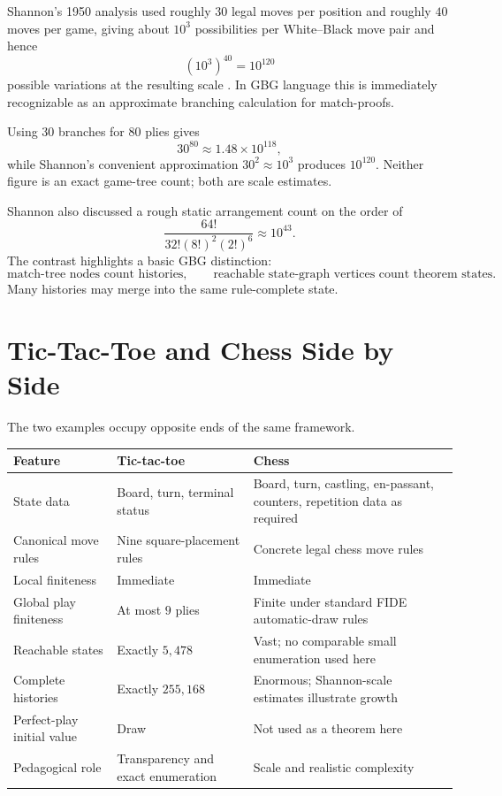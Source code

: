 \documentclass[11pt]{article}
\theoremstyle{definition}
\theoremstyle{remark}
\begin{document}
Shannon's 1950 analysis used roughly $30$ legal moves per position and roughly $40$ moves per game, giving about $10^3$ possibilities per White--Black move pair and hence
\[
(10^3)^{40}=10^{120}
\]
possible variations at the resulting scale \cite{Shannon1950}. In GBG language this is immediately recognizable as an approximate branching calculation for match-proofs.

Using $30$ branches for $80$ plies gives
\[
30^{80}\approx1.48\times10^{118},
\]
while Shannon's convenient approximation $30^2\approx10^3$ produces $10^{120}$. Neither figure is an exact game-tree count; both are scale estimates.

Shannon also discussed a rough static arrangement count on the order of
\[
\frac{64!}{32!(8!)^2(2!)^6}\approx10^{43}.
\]
The contrast highlights a basic GBG distinction:
\[
\boxed{\text{match-tree nodes count histories}},
\qquad
\boxed{\text{reachable state-graph vertices count theorem states}}.
\]
Many histories may merge into the same rule-complete state.

\section{Tic-Tac-Toe and Chess Side by Side}

The two examples occupy opposite ends of the same framework.

\begin{center}
\renewcommand{\arraystretch}{1.18}
\begin{tabular}{>{\raggedright\arraybackslash}p{} >{\raggedright\arraybackslash}p{} >{\raggedright\arraybackslash}p{}}
\toprule
\textbf{Feature} & \textbf{Tic-tac-toe} & \textbf{Chess} \\
\midrule
State data & Board, turn, terminal status & Board, turn, castling, en-passant, counters, repetition data as required \\
Canonical move rules & Nine square-placement rules & Concrete legal chess move rules \\
Local finiteness & Immediate & Immediate \\
Global play finiteness & At most $9$ plies & Finite under standard FIDE automatic-draw rules \\
Reachable states & Exactly $5,478$ & Vast; no comparable small enumeration used here \\
Complete histories & Exactly $255,168$ & Enormous; Shannon-scale estimates illustrate growth \\
Perfect-play initial value & Draw & Not used as a theorem here \\
Pedagogical role & Transparency and exact enumeration & Scale and realistic complexity \\
\bottomrule
\end{tabular}
\end{center}
\end{document}
